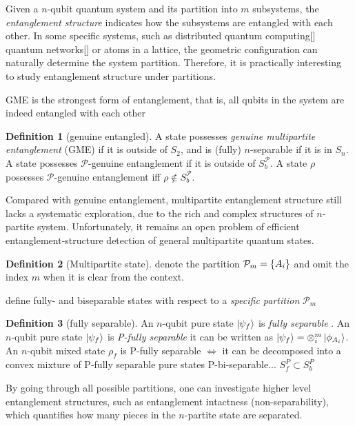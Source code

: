 \documentclass[
10pt,
aps,
pra,
linenumbers,
floatfix,
]{revtex4-2}
\theoremstyle{plain}
\theoremstyle{definition}
\newtheorem{definition}{Definition}
\newtheorem{remark}{Remark}
\newcommand{\ppartition}{\mathcal{P}}
\newcommand{\dm}{\rho}
\begin{document}
Given a $n$-qubit quantum system and its partition into $m$ subsystems, the \emph{entanglement structure} indicates how the subsystems are entangled with each other.
In some specific systems, such as distributed quantum computing[] quantum networks[] or atoms in a lattice, the geometric configuration can naturally determine the system partition.
Therefore, it is practically interesting to study entanglement structure under partitions.

GME is the strongest form of entanglement, that is, 
all qubits in the system are indeed entangled with each other
\begin{definition}[genuine entangled]\label{def:genuinely_entangled}
	A state possesses \emph{genuine multipartite entanglement} (GME) if it is outside of $S_2$, and is (fully) $n$-separable if it is in $S_n$.
	A state possesses $\ppartition$-genuine entanglement if it is outside of $S_b^\ppartition$.
	A state $\dm$ possesses $\ppartition$-genuine entanglement iff $\dm\notin S_b^\ppartition$.
\end{definition}
	Compared with genuine entanglement, multipartite entanglement structure still lacks a systematic exploration, due to the rich and complex structures of $n$-partite system.
	Unfortunately, it remains an open problem of efficient entanglement-structure detection of general multipartite quantum states.
\begin{definition}[Multipartite state]
	denote the partition $\ppartition_m = \qty{A_i}$
	and omit the index $m$ when it is clear from the context.
\end{definition}
define fully- and biseparable states with respect to a \emph{specific partition} $\ppartition_m$
\begin{definition}[fully separable]\label{def:fully_separable}
	An $n$-qubit pure state $\ket{\psi_f}$ is \emph{fully separable} \iff .
	An $n$-qubit pure state $\ket{\psi_f}$ is \emph{P-fully separable} \iff it can be written as 
	$\ket{\psi_f}=\otimes_i^m \ket{\phi_{A_i}}$.
	An $n$-qubit mixed state $\dm_f$ is P-fully separable $\iff$ it can be decomposed into a convex mixture of P-fully separable pure states 
	P-bi-separable... $S_f^P \subset S_b^P$
\end{definition}
By going through all possible partitions, one can investigate higher level entanglement structures, such as entanglement intactness (non-separability), which quantifies how many pieces in the $n$-partite state are separated.
\end{document}
